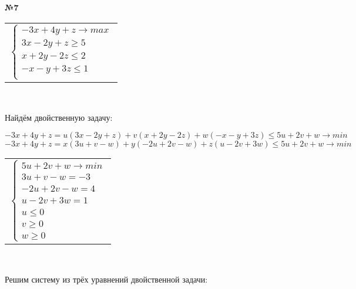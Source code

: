 \documentclass{article}
\newenvironment{task}{\begin{center}\fontsize{14}{14}\selectfont\bf}{\rm\fontsize{12}{12}\selectfont\end{center}}
\begin{document}
	
	\begin{task} 
		№7
	\end{task}
	\begin{center}
		\begin{tabular}{c}
			$\begin{cases}
			-3x+4y+z \rightarrow max \\
			3x-2y+z \geq 5 \\
			x+2y-2z \leq 2 \\
			-x-y+3z \leq 1 \\
			\end{cases}$
		\end{tabular}\\
	\end{center}
	Найдём двойственную задачу:
	\begin{center}
		$-3x+4y+z = u(3x-2y+z) + v(x+2y-2z) + w(-x-y+3z) \leq 5u+2v+w \rightarrow min$ \\
		$-3x+4y+z = x(3u+v-w) + y(-2u+2v-w) + z(u-2v+3w) \leq 5u+2v+w \rightarrow min$ \\
		\begin{tabular}{c}
			$\begin{cases}
			5u+2v+w \rightarrow min \\
			3u+v-w = -3 \\
			-2u+2v-w = 4 \\
			u-2v+3w = 1 \\
			u \leq 0 \\
			v \geq 0 \\ 
			w \geq 0
			\end{cases}$
		\end{tabular}\\
	\end{center}
	Решим систему из трёх уравнений двойственной задачи:\\
	\fontsize{6}{6}
\end{document}
